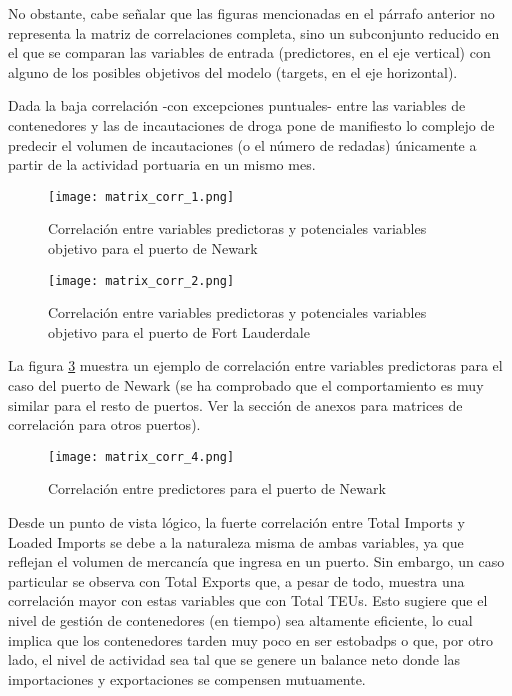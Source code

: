 \documentclass[12pt]{article}
\begin{document}
		No obstante, cabe señalar que las figuras mencionadas en el párrafo anterior no representa la matriz de correlaciones completa, sino un subconjunto reducido en el que se comparan las variables de entrada (predictores, en el eje vertical) con alguno de los posibles objetivos del modelo (targets, en el eje horizontal).
		
		Dada la baja correlación -con excepciones puntuales- entre las variables de contenedores y las de incautaciones de droga pone de manifiesto lo complejo de predecir el volumen de incautaciones (o el número de redadas) únicamente a partir de la actividad portuaria en un mismo mes. 
		
		\begin{figure}[H]
			\caption{\label{matriz_corr_1} Correlación entre variables predictoras y potenciales variables objetivo para el puerto de Newark}
			\centering
			\hspace*{1cm}
			\texttt{[image: matrix\_corr\_1.png]}
		\end{figure}
	
		\begin{figure}[H]
			\caption{\label{matriz_corr_2} Correlación entre variables predictoras y potenciales variables objetivo para el puerto de Fort Lauderdale}
			\centering
			\hspace*{1cm}
			\texttt{[image: matrix\_corr\_2.png]}
		\end{figure}
		
		La figura \ref{matriz_corr_4} muestra un ejemplo de correlación entre variables predictoras para el caso del puerto de Newark (se ha comprobado que el comportamiento es muy similar para el resto de puertos. Ver la sección de anexos para matrices de correlación para otros puertos).
		
		\begin{figure}[H]
			\caption{\label{matriz_corr_4} Correlación entre predictores para el puerto de Newark}
			\centering
			\hspace*{1cm}
			\texttt{[image: matrix\_corr\_4.png]}
		\end{figure}
	
		Desde un punto de vista lógico, la fuerte correlación entre Total Imports y Loaded Imports se debe a la naturaleza misma de ambas variables, ya que reflejan el volumen de mercancía que ingresa en un puerto. Sin embargo, un caso particular se observa con Total Exports que, a pesar de todo, muestra una correlación mayor con estas variables que con Total TEUs. Esto sugiere que el nivel de gestión de contenedores (en tiempo) sea altamente eficiente, lo cual implica que los contenedores tarden muy poco en ser estobadps o que, por otro lado, el nivel de actividad sea tal que se genere un balance neto donde las importaciones y exportaciones se compensen mutuamente.
		
\end{document}
